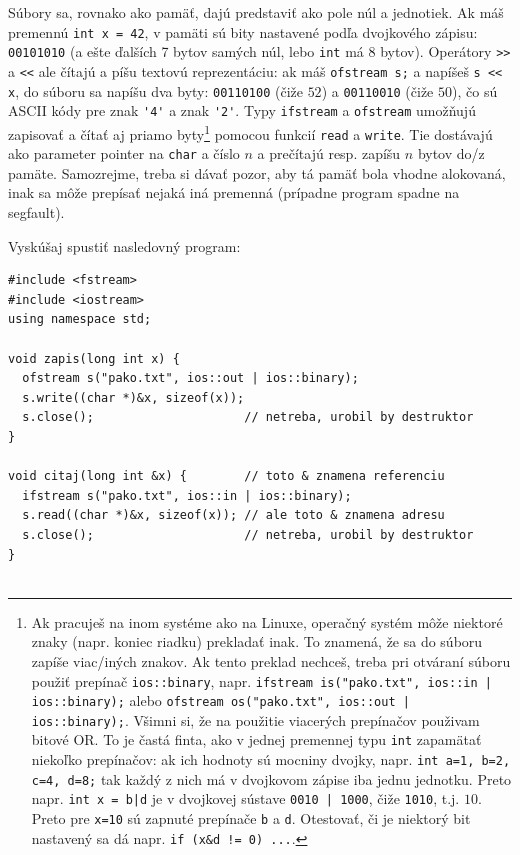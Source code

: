 \documentclass[10pt]{article}
\def\prg{\lstinline}
\def\ods{\vspace*{10pt}}
\begin{document}
{\ods
Súbory sa, rovnako ako pamäť, dajú predstaviť ako pole núl a jednotiek. Ak máš premennú
\prg!int x = 42!, v pamäti sú bity nastavené podľa dvojkového zápisu:
{\tt 00101010} (a ešte ďalších 7 bytov samých núl, lebo \prg!int! má 8 bytov).
Operátory \prg!>>! a \prg!<<! ale čítajú a píšu textovú reprezentáciu: ak 
máš \prg!ofstream s;!
a napíšeš \prg!s << x!, do súboru sa napíšu dva byty: {\tt 00110100} (čiže $52$) a 
{\tt 00110010} (čiže $50$), čo sú ASCII kódy pre
znak \prg!'4'! a znak \prg!'2'!. Typy \prg!ifstream! a \prg!ofstream! umožňujú zapisovať
a čítať aj priamo byty\footnote{%
  Ak pracuješ na inom systéme ako na Linuxe, operačný systém môže niektoré znaky (napr. 
  koniec riadku) prekladať inak. To znamená, že sa do súboru zapíše viac/iných znakov.
  Ak tento preklad nechceš, treba pri otváraní súboru použiť prepínač \prg!ios::binary!,
  napr. \prg!ifstream is("pako.txt", ios::in | ios::binary);! alebo
  \prg!ofstream os("pako.txt", ios::out | ios::binary);!. Všimni si, že na použitie
  viacerých prepínačov použivam bitové OR. To je častá finta, ako v jednej premennej typu
  \prg!int! zapamätať niekoľko prepínačov: ak ich hodnoty sú mocniny dvojky, napr.
  \prg!int a=1, b=2, c=4, d=8;! tak každý z nich má v dvojkovom zápise iba jednu jednotku. 
  Preto napr. \prg!int x = b|d! je v dvojkovej sústave {\tt 0010 | 1000}, čiže
  {\tt 1010}, t.j. $10$.  Preto pre \prg!x=10! sú zapnuté prepínače {\tt b} a {\tt d}. 
  Otestovať, či je niektorý bit nastavený sa dá napr.
  \prg~if (x&d != 0) ...~.
  } pomocou funkcií \prg!read! a \prg!write!. Tie dostávajú ako parameter pointer na 
  \prg!char! a číslo $n$ a prečítajú resp. zapíšu $n$ bytov do/z pamäte. Samozrejme, 
  treba si dávať pozor, aby tá pamäť bola vhodne alokovaná, inak sa môže prepísať
  nejaká iná premenná (prípadne program spadne na segfault). 

  \ods Vyskúšaj spustiť nasledovný program:
  
\begin{lstlisting}
#include <fstream>
#include <iostream>
using namespace std;

void zapis(long int x) {          
  ofstream s("pako.txt", ios::out | ios::binary);
  s.write((char *)&x, sizeof(x));
  s.close();                     // netreba, urobil by destruktor
}

void citaj(long int &x) {        // toto & znamena referenciu
  ifstream s("pako.txt", ios::in | ios::binary);
  s.read((char *)&x, sizeof(x)); // ale toto & znamena adresu
  s.close();                     // netreba, urobil by destruktor
}


\end{lstlisting}}
\end{document}
